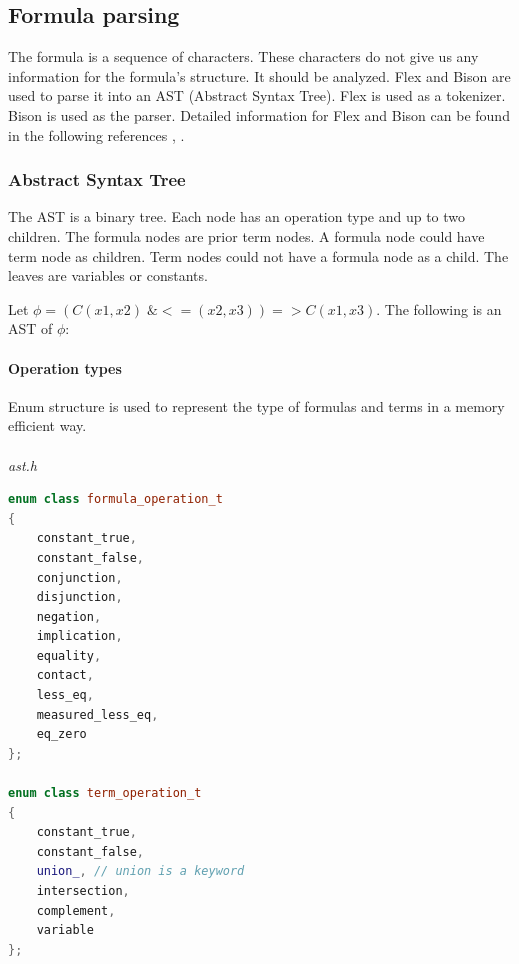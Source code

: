 \documentclass{article}
\begin{document}
	\subsection{Formula parsing}
	The formula is a sequence of characters. These characters do not give us any information for the formula's structure. It should be analyzed. Flex and Bison are used to parse it into an AST (Abstract Syntax Tree). Flex is used as a tokenizer. Bison is used as the parser. Detailed information for Flex and Bison can be found in the following references \cite{flex-tokenizer}, \cite{bison-parser}.

	\subsubsection{Abstract Syntax Tree}
	The AST is a binary tree. Each node has an operation type and up to two children. The formula nodes are prior term nodes. A formula node could have term node as children. Term nodes could not have a formula node as a child. The leaves are variables or constants.
	
	Let $\phi = (C(x1,x2) \;\& <=(x2, x3)) => C(x1, x3)$. The following is an AST of $\phi$:


	\newpage
	\paragraph{Operation types} Enum structure is used to represent the type of formulas and terms in a memory efficient way.
	\\
	\\
\noindent
\textit{ast.h}
	\begin{lstlisting}[language=C++]
enum class formula_operation_t
{
    constant_true,
    constant_false,
    conjunction,
    disjunction,
    negation,
    implication,
    equality,
    contact,
    less_eq,
    measured_less_eq,
    eq_zero
};

enum class term_operation_t
{
    constant_true,
    constant_false,
    union_, // union is a keyword
    intersection,
    complement,
    variable
};
	\end{lstlisting}
\end{document}
